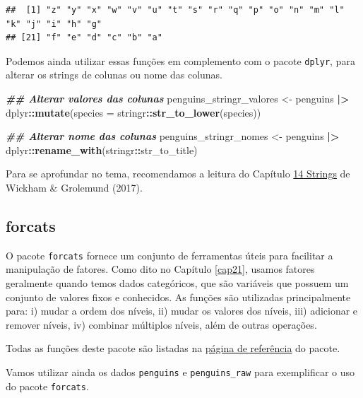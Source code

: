 \documentclass[
]{article}
\newenvironment{Shaded}{\begin{snugshade}}{\end{snugshade}}
\newcommand{\AttributeTok}[1]{\textcolor[rgb]{0.13,0.29,0.53}{#1}}
\newcommand{\DocumentationTok}[1]{\textcolor[rgb]{0.56,0.35,0.01}{\textbf{\textit{#1}}}}
\newcommand{\FunctionTok}[1]{\textcolor[rgb]{0.13,0.29,0.53}{\textbf{#1}}}
\newcommand{\NormalTok}[1]{#1}
\newcommand{\OtherTok}[1]{\textcolor[rgb]{0.56,0.35,0.01}{#1}}
\newcommand{\SpecialCharTok}[1]{\textcolor[rgb]{0.81,0.36,0.00}{\textbf{#1}}}
\begin{document}
\begin{verbatim}
##  [1] "z" "y" "x" "w" "v" "u" "t" "s" "r" "q" "p" "o" "n" "m" "l" "k" "j" "i" "h" "g"
## [21] "f" "e" "d" "c" "b" "a"
\end{verbatim}

Podemos ainda utilizar essas funções em complemento com o pacote \texttt{dplyr}, para alterar os strings de colunas ou nome das colunas.

\begin{Shaded}
\begin{Highlighting}[]
\DocumentationTok{\#\# Alterar valores das colunas}
\NormalTok{penguins\_stringr\_valores }\OtherTok{\textless{}{-}}\NormalTok{ penguins }\SpecialCharTok{|\textgreater{}} 
\NormalTok{    dplyr}\SpecialCharTok{::}\FunctionTok{mutate}\NormalTok{(}\AttributeTok{species =}\NormalTok{ stringr}\SpecialCharTok{::}\FunctionTok{str\_to\_lower}\NormalTok{(species))}

\DocumentationTok{\#\# Alterar nome das colunas}
\NormalTok{penguins\_stringr\_nomes }\OtherTok{\textless{}{-}}\NormalTok{ penguins }\SpecialCharTok{|\textgreater{}} 
\NormalTok{    dplyr}\SpecialCharTok{::}\FunctionTok{rename\_with}\NormalTok{(stringr}\SpecialCharTok{::}\NormalTok{str\_to\_title)}
\end{Highlighting}
\end{Shaded}

Para se aprofundar no tema, recomendamos a leitura do Capítulo \href{https://r4ds.had.co.nz/strings.html}{14 Strings} de Wickham \& Grolemund (2017).

\hypertarget{forcats}{%
\subsection{forcats}\label{forcats}}

O pacote \texttt{forcats} fornece um conjunto de ferramentas úteis para facilitar a manipulação de fatores. Como dito no Capítulo \ref{cap21}, usamos fatores geralmente quando temos dados categóricos, que são variáveis que possuem um conjunto de valores fixos e conhecidos. As funções são utilizadas principalmente para: i) mudar a ordem dos níveis, ii) mudar os valores dos níveis, iii) adicionar e remover níveis, iv) combinar múltiplos níveis, além de outras operações.

Todas as funções deste pacote são listadas na \href{https://forcats.tidyverse.org/reference/index.html}{página de referência} do pacote.

Vamos utilizar ainda os dados \texttt{penguins} e \texttt{penguins\_raw} para exemplificar o uso do pacote \texttt{forcats}.
\end{document}
